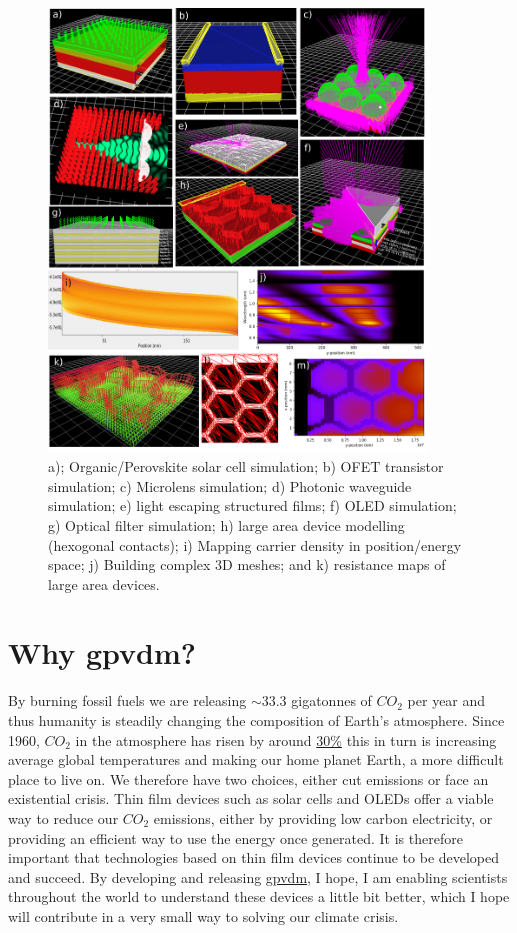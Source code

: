 \begin{figure}
\centering
\includegraphics[width=0.9\textwidth]{./images/all_devices.png}
\caption{a); Organic/Perovskite solar cell simulation; b) OFET transistor simulation; c) Microlens simulation; d) Photonic waveguide simulation; e) light escaping structured films; f) OLED simulation; g) Optical filter simulation; h) large area device modelling (hexogonal contacts); i) Mapping carrier density in position/energy space; j) Building complex 3D meshes; and k) resistance maps of large area devices.}
\label{fig:alldevices}
\end{figure}

\section{Why gpvdm?}
By burning fossil fuels we are releasing $\sim 33.3$ gigatonnes of $CO_2$ per year \cite{Liu2022} and thus humanity is steadily changing the composition of Earth's atmosphere. Since 1960, $CO_{2}$ in the atmosphere has risen by around \href{https://gml.noaa.gov/ccgg/trends/}{30\%} this in turn is increasing average global temperatures\cite{ManabeandWetherald} and making our home planet Earth, a more difficult place to live on. We therefore have two choices, either cut emissions or face an existential crisis. Thin film devices such as solar cells and OLEDs offer a viable way to reduce our $CO_{2}$ emissions, either by providing low carbon electricity, or providing an efficient way to use the energy once generated. It is therefore important that technologies based on thin film devices continue to be developed and succeed. By developing and releasing \href{www.gpvdm.com}{gpvdm}, I hope, I am enabling scientists throughout the world to understand these devices a little bit better, which I hope will contribute in a very small way to solving our climate crisis.

